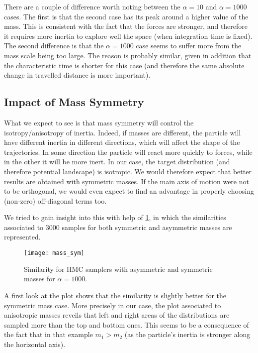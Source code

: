 \documentclass[a4paper, 12pt,oneside]{article}
\begin{document}
			There are a couple of difference worth noting between the $\alpha=10$ and $\alpha=1000$ cases. The first is that the second case has its peak around a higher value of the mass. This is consistent with the fact that the forces are stronger, and therefore it requires more inertia to explore well the space (when integration time is fixed). 
			The second difference is that the $\alpha=1000$ case seems to suffer more from the mass scale being too large. The reason is probably similar, given in addition that the characteristic time is shorter for this case (and therefore the same absolute change in travelled distance is more important).
			\subsection{Impact of Mass Symmetry}
			What we expect to see is that mass symmetry will control the isotropy/anisotropy of inertia. Indeed, if masses are different, the particle will have different inertia in different directions, which will affect the shape of the trajectories. In some direction the particle will react more quickly to forces, while in the other it will be more inert.
			In our case, the target distribution (and therefore potential landscape) is isotropic. We would therefore expect that better results are obtained with symmetric masses. If the main axis of motion were not to be orthogonal, we would even expect to find an advantage in properly choosing (non-zero) off-diagonal terms too. 

			We tried to gain insight into this with help of \ref{fig:mass-sym}, in which the similarities associated to 3000 samples for both symmetric and asymmetric masses are represented.
			\begin{figure}[htb]
				\centering
					\vspace{0em}
					\texttt{[image: mass\_sym]}
					\caption{Similarity for HMC samplers with asymmetric and symmetric masses for $\alpha=1000$.}
					\label{fig:mass-sym}
			\end{figure}
			A first look at the plot shows that the similarity is slightly better for the symmetric mass case. 
			More precisely in our case, the plot associated to anisotropic masses reveils that left and right areas of the distributions are sampled more than the top and bottom ones. This seems to be a consequence of the fact that in that example $m_1>m_2$ (as the particle's inertia is stronger along the horizontal axis). 
\end{document}
